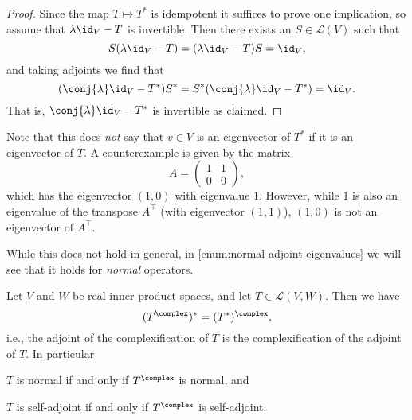 \documentclass[article, a4paper, 11pt, oneside]{memoir}
\numberwithin{equation}{chapter}
\newcommand{\calL}{\mathcal{L}}
\newcommand{\trans}{^{\top}}
\begin{document}
\begin{proof}
    Since the map $T \mapsto T^*$ is idempotent it suffices to prove one implication, so assume that $\lambda \id_V - T$ is invertible. Then there exists an $S \in \calL(V)$ such that
    \begin{equation*}
        S(\lambda \id_V - T)
            = (\lambda \id_V - T)S
            = \id_V,
    \end{equation*}
    and taking adjoints we find that
    \begin{equation*}
        (\conj{\lambda} \id_V - T^*)S^*
            = S^*(\conj{\lambda} \id_V - T^*)
            = \id_V.
    \end{equation*}
    That is, $\conj{\lambda} \id_V - T^*$ is invertible as claimed.
\end{proof}

\begin{remark}
    Note that this does \emph{not} say that $v \in V$ is an eigenvector of $T^*$ if it is an eigenvector of $T$. A counterexample is given by the matrix
    \begin{equation*}
        A =
        \begin{pmatrix}
            1 & 1 \\
            0 & 0
        \end{pmatrix},
    \end{equation*}
    which has the eigenvector $(1,0)$ with eigenvalue $1$. However, while $1$ is also an eigenvalue of the transpose $A\trans$ (with eigenvector $(1,1)$), $(1,0)$ is not an eigenvector of $A\trans$.

    While this does not hold in general, in \cref{enum:normal-adjoint-eigenvalues} we will see that it holds for \emph{normal} operators.
\end{remark}



\begin{proposition}
    \label{prop:complexification-adjoint}
    Let $V$ and $W$ be real inner product spaces, and let $T \in \calL(V,W)$. Then we have
    \begin{equation*}
        (T^\complex)^*
            = (T^*)^\complex,
    \end{equation*}
    i.e., the adjoint of the complexification of $T$ is the complexification of the adjoint of $T$. In particular
    \begin{enumprop}
        \item $T$ is normal if and only if $T^\complex$ is normal, and
        \item $T$ is self-adjoint if and only if $T^\complex$ is self-adjoint.
    \end{enumprop}
\end{proposition}
\end{document}
